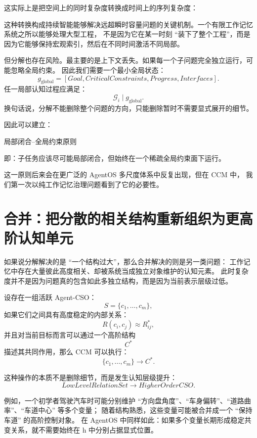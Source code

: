 这实际上是把空间上的同时复杂度转换成时间上的序列复杂度：
\begin{statementbox}
\centering
{}
\end{statementbox}

这种转换构成持续智能能够解决远超瞬时容量问题的关键机制。一个有限工作记忆系统之所以能够处理大型工程，
不是因为它在某一时刻 ``装下了整个工程''，而是因为它能够保持宏观索引，然后在不同时间激活不同局部。

但分解也存在风险。最主要的是上下文丢失。如果每一个子问题完全独立运行，可能忽略全局约束。
因此我们需要一个最小全局状态：
\[
g_{\mathrm{global}}
=
[
Goal,
CriticalConstraints,
Progress,
Interfaces
].
\]
任一局部认知过程应满足：
\[
\mathcal G_i
\mid
g_{\mathrm{global}}.
\]
换句话说，分解不能删除整个问题的方向，只能删除暂时不需要显式展开的细节。

因此可以建立：
\begin{statementbox}
局部闭合--全局约束原则
\end{statementbox}
即：子任务应该尽可能局部闭合，但始终在一个稀疏全局约束面下运行。

这一原则后来会在更广泛的 AgentOS 多尺度体系中反复出现，但在 CCM 中，
我们第一次以纯工作记忆治理问题看到了它的必要性。


\section{合并：把分散的相关结构重新组织为更高阶认知单元}

如果说分解解决的是 ``一个结构过大''，那么合并解决的则是另一类问题：
工作记忆中存在大量彼此高度相关、却被系统当成独立对象维护的认知元素。
此时复杂度并不是因为问题真的包含如此多独立结构，而是因为当前表示层级过低。

设存在一组活跃 Agent-CSO：
\[
S
=
\{c_1,\ldots,c_m\},
\]
如果它们之间具有高度稳定的内部关系：
\[
R(c_i,c_j)
\approx
R^*_{ij},
\]
并且对当前目标而言可以通过一个高阶结构
\[
C^*
\]
描述其共同作用，那么 CCM 可以执行：
\[
\boxed{
\{c_1,\ldots,c_m\}
\longrightarrow
C^*.
}
\]

这种操作的本质不是删除细节，而是发生认知层级提升：
\[
LowLevelRelationSet
\longrightarrow
HigherOrderCSO.
\]

例如，一个初学者驾驶汽车时可能分别维护 ``方向盘角度''、``车身偏转''、``道路曲率''、``车道中心'' 等多个变量；
随着结构熟悉，这些变量可能被合并成一个 ``保持车道'' 的高阶控制对象。
在 AgentOS 中同样如此：如果多个变量长期形成稳定共变关系，就不需要始终在 h 中分别占据显式位置。

